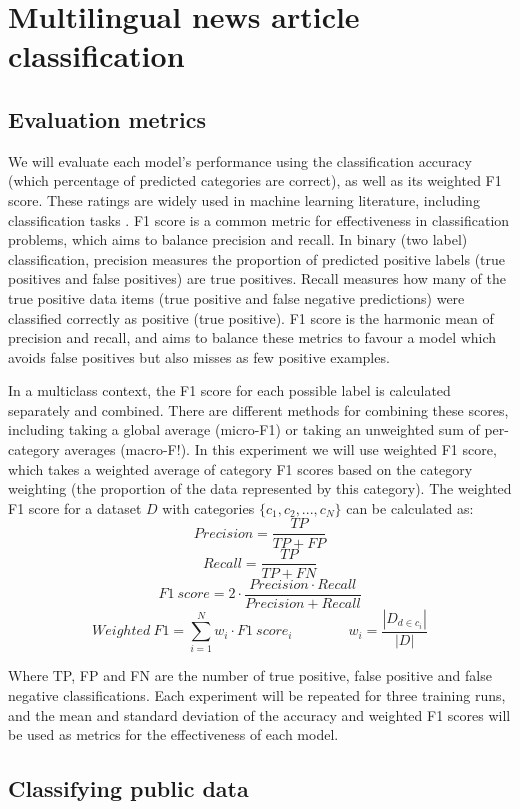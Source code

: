 \documentclass{l4proj}
\begin{document}
\section{Multilingual news article classification}
\subsection{Evaluation metrics}
We will evaluate each model's performance using the  classification accuracy (which percentage of predicted categories are correct), as well as its weighted F1 score. These ratings are widely used in machine learning literature, including classification tasks \citep{alam2020bangla, al2020multiple, ranasinghe2020multilingual}. F1 score is a common metric for effectiveness in classification problems, which aims to balance precision and recall. In binary (two label) classification, precision measures the proportion of predicted positive labels (true positives and false positives) are true positives. Recall measures how many of the true positive data items (true positive and false negative predictions) were classified correctly as positive (true positive). F1 score is the harmonic mean of precision and recall, and aims to balance these metrics to favour a model which avoids false positives but also misses as few positive examples. \par
In a multiclass context, the F1 score for each possible label is calculated separately and combined. There are different methods for combining these scores, including taking a global average (micro-F1) or taking an unweighted sum of per-category averages (macro-F!). In this experiment we will use weighted F1 score, which takes a weighted average of category F1 scores based on the category weighting (the proportion of the data represented by this category). The weighted F1 score for a dataset $D$ with categories $\{c_1, c_2, ..., c_N\}$ can be calculated as:
$$Precision=\frac{TP}{TP+FP}$$ 
$$Recall=\frac{TP}{TP+FN}
$$ $$F1 \ score=2 \cdot \frac{Precision \cdot Recall}{Precision + Recall}$$
$$Weighted \ F1=\sum_{i=1}^{N}w_i \cdot F1 \ score_i \quad \quad \quad \quad w_i=\frac{|D_{d \in c_i}|}{|D|}$$

Where TP, FP and FN are the number of true positive, false positive and false negative classifications. Each experiment will be repeated for three training runs, and the mean and standard deviation of the accuracy and weighted F1 scores will be used as metrics for the effectiveness of each model.

\subsection{Classifying public data}
\end{document}
